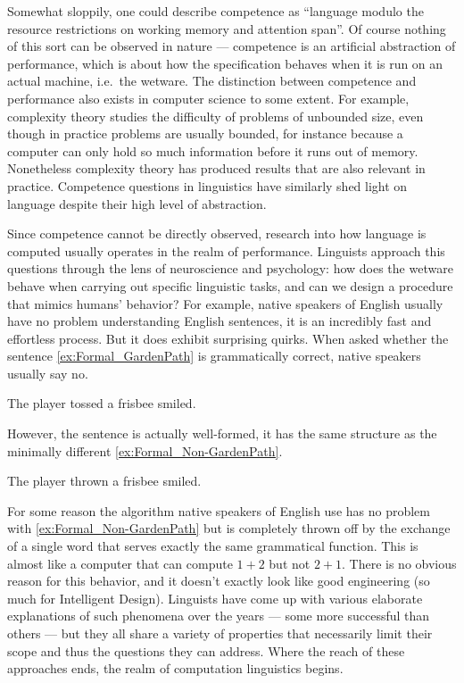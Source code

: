 Somewhat sloppily, one could describe competence as ``language modulo the resource restrictions on working memory and attention span''.
Of course nothing of this sort can be observed in nature --- competence is an artificial abstraction of performance, which is about how the specification behaves when it is run on an actual machine, i.e.\ the wetware.
The distinction between competence and performance also exists in computer science to some extent.
For example, complexity theory studies the difficulty of problems of unbounded size, even though in practice problems are usually bounded, for instance because a computer can only hold so much information before it runs out of memory.
Nonetheless complexity theory has produced results that are also relevant in practice.
Competence questions in linguistics have similarly shed light on language despite their high level of abstraction.

Since competence cannot be directly observed, research into how language is computed usually operates in the realm of performance.
Linguists approach this questions through the lens of neuroscience and psychology: how does the wetware behave when carrying out specific linguistic tasks, and can we design a procedure that mimics humans' behavior?
For example, native speakers of English usually have no problem understanding English sentences, it is an incredibly fast and effortless process.
But it does exhibit surprising quirks.
When asked whether the sentence \eqref{ex:Formal_GardenPath} is grammatically correct, native speakers usually say no.
%
\begin{exe}
        \ex The player tossed a frisbee smiled.\label{ex:Formal_GardenPath}
\end{exe}
%
However, the sentence is actually well-formed, it has the same structure as the minimally different \eqref{ex:Formal_Non-GardenPath}. 
%
\begin{exe}
    \ex The player thrown a frisbee smiled.\label{ex:Formal_Non-GardenPath}
\end{exe}
%
For some reason the algorithm native speakers of English use has no problem with \eqref{ex:Formal_Non-GardenPath} but is completely thrown off by the exchange of a single word that serves exactly the same grammatical function.
This is almost like a computer that can compute $1 + 2$ but not $2 + 1$.
There is no obvious reason for this behavior, and it doesn't exactly look like good engineering (so much for Intelligent Design).
Linguists have come up with various elaborate explanations of such phenomena over the years --- some more successful than others ---
but they all share a variety of properties that necessarily limit their scope and thus the questions they can address.
Where the reach of these approaches ends, the realm of computation linguistics begins.

